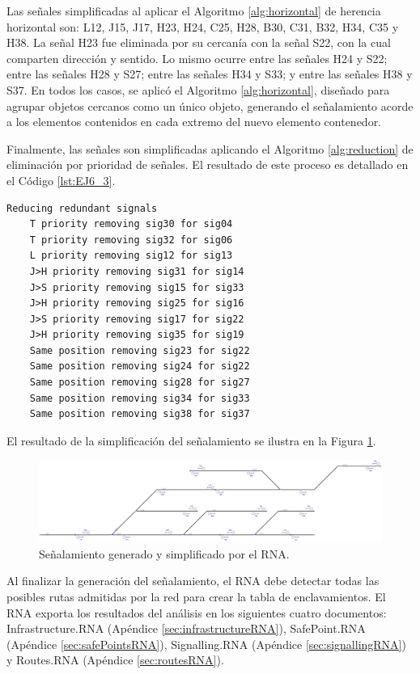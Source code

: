 	Las señales simplificadas al aplicar el Algoritmo \ref{alg:horizontal} de herencia horizontal son: L12, J15, J17, H23, H24, C25, H28, B30, C31, B32, H34, C35 y H38. La señal H23 fue eliminada por su cercanía con la señal S22, con la cual comparten dirección y sentido. Lo mismo ocurre entre las señales H24 y S22; entre las señales H28 y S27; entre las señales H34 y S33; y entre las señales H38 y S37. En todos los casos, se aplicó el Algoritmo \ref{alg:horizontal}, diseñado para agrupar objetos cercanos como un único objeto, generando el señalamiento acorde a los elementos contenidos en cada extremo del nuevo elemento contenedor.
	
	Finalmente, las señales son simplificadas aplicando el Algoritmo \ref{alg:reduction} de eliminación por prioridad de señales. El resultado de este proceso es detallado en el Código \ref{lst:EJ6_3}.
	
	\begin{lstlisting}[language = {}, caption = Reducción de señalamiento por prioridad de señales, label = {lst:EJ6_3}]
	Reducing redundant signals
	T priority removing sig30 for sig04
	T priority removing sig32 for sig06
	L priority removing sig12 for sig13
	J>H priority removing sig31 for sig14
	J>S priority removing sig15 for sig33
	J>H priority removing sig25 for sig16
	J>S priority removing sig17 for sig22
	J>H priority removing sig35 for sig19
	Same position removing sig23 for sig22
	Same position removing sig24 for sig22
	Same position removing sig28 for sig27
	Same position removing sig34 for sig33
	Same position removing sig38 for sig37
	\end{lstlisting}

	El resultado de la simplificación del señalamiento se ilustra en la Figura \ref{fig:EJ6_7}.
	
	 \begin{figure}[H]
		\centering
		\includegraphics[width=1\textwidth]{resultados-obtenidos/ejemplo6/images/6_RNA.png}
		\centering\caption{Señalamiento generado y simplificado por el RNA.}
		\label{fig:EJ6_7}
	\end{figure}

	Al finalizar la generación del señalamiento, el RNA debe detectar todas las posibles rutas admitidas por la red para crear la tabla de enclavamientos. El RNA exporta los resultados del análisis en los siguientes cuatro documentos: Infrastructure.RNA (Apéndice \ref{sec:infrastructureRNA}), SafePoint.RNA (Apéndice \ref{sec:safePointsRNA}), Signalling.RNA (Apéndice \ref{sec:signallingRNA}) y Routes.RNA (Apéndice \ref{sec:routesRNA}).	